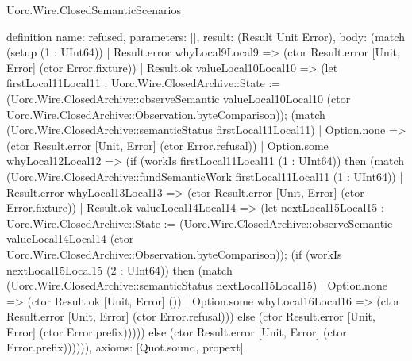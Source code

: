 \begin{lexlean}{Uorc.Wire.ClosedSemanticScenarios}
\begin{semanticmodule}
definition{
  name: refused,
  parameters: [],
  result: (Result Unit Error),
  body: (match (setup (1 : UInt64))
    | Result.error whyLocal9Local9 => (ctor Result.error [Unit, Error] (ctor Error.fixture))
    | Result.ok valueLocal10Local10 => (let firstLocal11Local11 : Uorc.Wire.ClosedArchive::State := (Uorc.Wire.ClosedArchive::observeSemantic valueLocal10Local10 (ctor Uorc.Wire.ClosedArchive::Observation.byteComparison)); (match (Uorc.Wire.ClosedArchive::semanticStatus firstLocal11Local11)
      | Option.none => (ctor Result.error [Unit, Error] (ctor Error.refusal))
      | Option.some whyLocal12Local12 => (if (workIs firstLocal11Local11 (1 : UInt64)) then (match (Uorc.Wire.ClosedArchive::fundSemanticWork firstLocal11Local11 (1 : UInt64))
        | Result.error whyLocal13Local13 => (ctor Result.error [Unit, Error] (ctor Error.fixture))
        | Result.ok valueLocal14Local14 => (let nextLocal15Local15 : Uorc.Wire.ClosedArchive::State := (Uorc.Wire.ClosedArchive::observeSemantic valueLocal14Local14 (ctor Uorc.Wire.ClosedArchive::Observation.byteComparison)); (if (workIs nextLocal15Local15 (2 : UInt64)) then (match (Uorc.Wire.ClosedArchive::semanticStatus nextLocal15Local15)
          | Option.none => (ctor Result.ok [Unit, Error] ())
          | Option.some whyLocal16Local16 => (ctor Result.error [Unit, Error] (ctor Error.refusal))) else (ctor Result.error [Unit, Error] (ctor Error.prefix))))) else (ctor Result.error [Unit, Error] (ctor Error.prefix)))))),
  axioms: [Quot.sound, propext]
}


\end{semanticmodule}
\end{lexlean}
